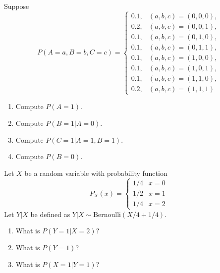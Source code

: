 \begin{exercise}
Suppose 
\begin{equation*}
P(A=a,B=b,C=c) = \begin{cases}
0.1, & (a,b,c)=(0,0,0),\\
0.2, & (a,b,c)=(0,0,1),\\
0.1, & (a,b,c)=(0,1,0),\\
0.1, & (a,b,c)=(0,1,1),\\
0.1, & (a,b,c)=(1,0,0),\\
0.1, & (a,b,c)=(1,0,1),\\
0.1, & (a,b,c)=(1,1,0),\\
0.2, & (a,b,c)=(1,1,1)
\end{cases}
\end{equation*}
\begin{enumerate}[label=(\alph*)]
\item Compute $P(A=1)$.
\item Compute $P(B=1|A=0)$.
\item Compute $P(C=1|A=1, B=1)$.
\item Compute $P(B=0)$.
\end{enumerate}
\end{exercise}




\begin{exercise}
Let $X$ be a random variable with probability function
\begin{equation*}
P_X(x) = \begin{cases}
  1/4 & x=0 \\
  1/2 & x=1 \\
  1/4 & x=2
\end{cases}
\end{equation*}
Let $Y|X$ be defined as $Y|X \sim \text{Bernoulli}(X/4 + 1/4)$.
\begin{enumerate}[label=(\alph*)]
\item What is $P(Y=1|X=2)$?
\item What is $P(Y=1)$?
\item What is $P(X=1|Y=1)$?
\end{enumerate}
\end{exercise}


